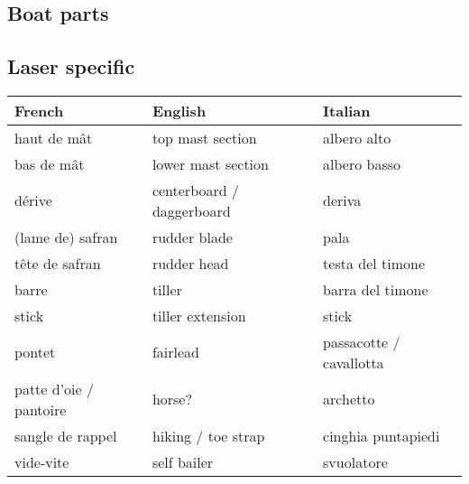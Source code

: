 \documentclass[a4paper, 12pt, twoside]{article}
\begin{document}
\begin{indt}{\section{Boat parts}}
        \begin{indt}{\subsection{Laser specific}} %
            \begin{tabular}{|l|l|l|}
                \hline %
                \textbf{French}
                & \textbf{English}
                & \textbf{Italian}
                \\
                \hline
                \hline %
                haut de mât %
                & top mast section
                & albero alto
                \\
                \hline %
                bas de mât %
                & lower mast section
                & albero basso
                \\
                \hline %
                dérive %
                & centerboard / daggerboard 
                & deriva
                \\
                \hline %
                (lame de) safran %
                & rudder blade
                & pala
                \\
                \hline %
                tête de safran %
                & rudder head
                & testa del timone
                \\
                \hline %
                barre %
                & tiller
                & barra del timone
                \\
                \hline %
                stick %
                & tiller extension
                & stick
                \\
                \hline %
                pontet %
                & fairlead
                & passacotte / cavallotta
                \\
                \hline %
                patte d'oie / pantoire %
                & horse?
                & archetto
                \\
                \hline %
                sangle de rappel %
                & hiking / toe strap
                & cinghia puntapiedi
                \\
                \hline %
                vide-vite %
                & self bailer
                & svuolatore
                \\

\end{tabular}
\end{indt}
\end{indt}
\end{document}
